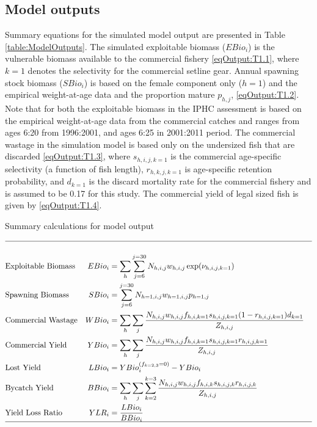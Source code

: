 \subsection{Model outputs} %
\label{sub:model_outputs}

Summary equations for the simulated model output are presented in Table \ref{table:ModelOutputs}.  The simulated exploitable biomass ($EBio_i$) is the vulnerable biomass available to the commercial fishery \eqref{eqOutput:T1.1}, where $k=1$ denotes the selectivity for the commercial setline gear.  Annual spawning stock biomass ($SBio_i$) is based on the female component only ($h=1$) and the empirical weight-at-age data and the proportion mature $p_{h,j}$, \eqref{eqOutput:T1.2}.  Note that for both the exploitable biomass  in the IPHC assessment is based on the empirical weight-at-age data from the commercial catches and ranges from ages 6:20 from 1996:2001, and ages 6:25 in 2001:2011 period.  The commercial wastage in the simulation model is based only on the undersized fish that are discarded \eqref{eqOutput:T1.3}, where $s_{h,i,j,k=1}$ is the commercial age-specific selectivity (a function of fish length), $r_{h,k,j,k=1}$ is age-specific retention probability, and $d_{k=1}$ is the discard mortality rate for the commercial fishery and is assumed to be 0.17 for this study.  The commercial yield of legal sized fish is given by \eqref{eqOutput:T1.4}.

\begin{table}
	\caption{Summary calculations for model output}
	\label{table:ModelOutputs}
	\begin{center}
	\tableEq
	\begin{align}
		\hline \nonumber\\
		&\mbox{Exploitable Biomass}
		&EBio_i &= \sum_h \sum_{j=6}^{j=30} N_{h,i,j} w_{h,i,j} \exp(\nu_{h,i,j,k=1})\label{eqOutput:T1.1} \\
		&\mbox{Spawning Biomass}
		&SBio_i &= \sum_{j=6}^{j=30} N_{h=1,i,j} w_{h=1,i,j} p_{h=1,j}\label{eqOutput:T1.2}\\
		&\mbox{Commercial Wastage}
		&WBio_i &= \sum_h \sum_j \frac{N_{h,i,j}w_{h,i,j}f_{h,i,k=1}s_{h,i,j,k=1}(1-r_{h,i,j,k=1})d_{k=1}}
		{Z_{h,i,j}} \label{eqOutput:T1.3}\\
		&\mbox{Commercial Yield}
		&YBio_i &= \sum_h \sum_j \frac{N_{h,i,j}w_{h,i,j}f_{h,i,k=1}s_{h,i,j,k=1} r_{h,i,j,k=1}}
		{Z_{h,i,j}}\label{eqOutput:T1.4}\\
		&\mbox{Lost Yield}
		&LBio_i &= YBio_i^{(f_{k=2,3}=0)} - YBio_i \label{eqOutput:T1.5}\\
		&\mbox{Bycatch Yield}
		&BBio_i &= \sum_h \sum_j \sum_{k=2}^{k=3}\frac{N_{h,i,j}w_{h,i,j}f_{h,i,k}s_{h,i,j,k} r_{h,i,j,k}}
		{Z_{h,i,j}}\label{eqOutput:T1.6}\\
		&\mbox{Yield Loss Ratio}
		&YLR_i & = \frac{LBio_i}{BBio_i}\label{eqOutput:T1.7} \\
		\hline \nonumber
	\end{align}
	\normalEq
	\end{center}
\end{table}

